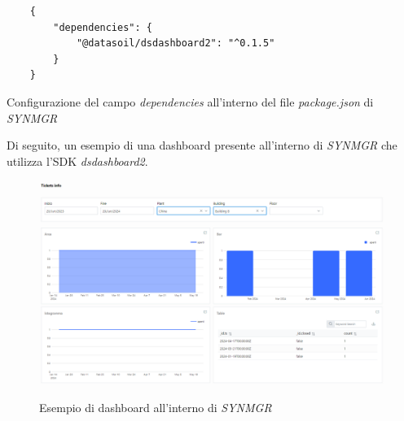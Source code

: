 \begin{listing}[H]
    \begin{verbatim}
    {
        "dependencies": {
            "@datasoil/dsdashboard2": "^0.1.5"
        }
    }
    \end{verbatim}
    \caption{Configurazione del campo \textit{dependencies} all'interno del file \textit{package.json} di \textit{SYNMGR}}
    \label{listing:package_json_synmgr}
\end{listing}

Di seguito, un esempio di una dashboard presente all'interno di \textit{SYNMGR} che utilizza l'SDK \textit{dsdashboard2}.

\begin{figure}[H]
    \centering
    \includegraphics[alt={Esempio di dashboard all'interno di SYNMGR}, width=1 \columnwidth]{img/synmgr-dashboard.png}
    \caption{Esempio di dashboard all'interno di \textit{SYNMGR}}
    \label{fig:synmgr_dashboard}
\end{figure}